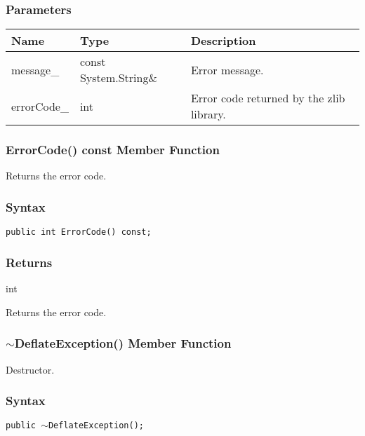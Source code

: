 \documentclass[a4paper,oneside,11.000000pt]{book}
\begin{document}
\subsubsection*{Parameters}
\begin{flushleft}
\begin{supertabular}[l]{lll}
\textbf{Name}
& \textbf{Type}
& \textbf{Description}
\\
\hline
message\_
& const System.\-String\&\-
& Error message.

\\
errorCode\_
& int
& Error code returned by the zlib library.

\\
\end{supertabular}

\end{flushleft}
\clearpage

\hypertarget{System.IO.Compression.DeflateException.ErrorCode.C.P.System.IO.Compression.DeflateException}{\subsubsection*{ErrorCode() const Member Function}}\begin{flushleft}
Returns the error code.

\end{flushleft}

\subsubsection*{Syntax}\texttt{public int ErrorCode() const;}
\subsubsection*{Returns}int
\begin{flushleft}
Returns the error code.

\end{flushleft}
\clearpage

\hypertarget{System.IO.Compression.DeflateException.destructor.P.System.IO.Compression.DeflateException}{\subsubsection*{$\sim$DeflateException() Member Function}}\begin{flushleft}
Destructor.

\end{flushleft}
\subsubsection*{Syntax}
\texttt{public $\sim$DeflateException();}
\clearpage
\end{document}
